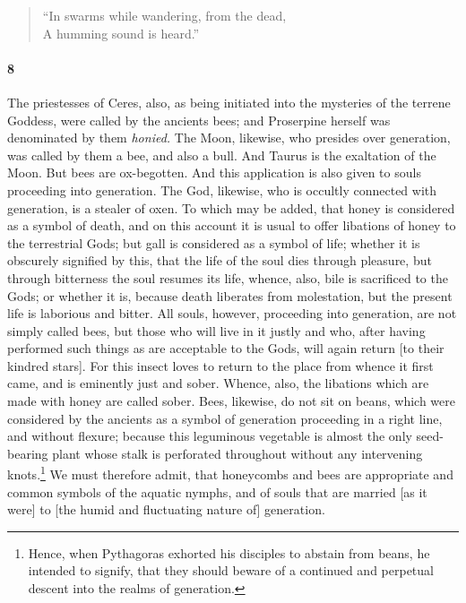 \documentclass[12pt]{article}
\begin{document}
\begin{verse}
``In swarms while wandering, from the dead,\\
A humming sound is heard.''
\end{verse}


\paragraph{8} The priestesses of Ceres, also, as being initiated into the
mysteries of the terrene Goddess, were called by the ancients bees; and
Proserpine herself was denominated by them \textit{honied.} The Moon, likewise,
who presides over generation, was called by them a bee, and also a bull. And
Taurus is the exaltation of the Moon. But bees are ox-begotten. And this
application is also given to souls proceeding into generation. The God,
likewise, who is occultly connected with generation, is a stealer of oxen. To
which may be added, that honey is considered as a symbol of death, and on this
account it is usual to offer libations of honey to the terrestrial Gods; but
gall is considered as a symbol of life; whether it is obscurely signified by
this, that the life of the soul dies through pleasure, but through bitterness
the soul resumes its life, whence, also, bile is sacrificed to the Gods; or
whether it is, because death liberates from molestation, but the present life
is laborious and bitter. All souls, however, proceeding into generation, are
not simply called bees, but those who will live in it justly and who, after
having performed such things as are acceptable to the Gods, will again return
[to their kindred stars]. For this insect loves to return to the place from
whence it first came, and is eminently just and sober. Whence, also, the
libations which are made with honey are called sober. Bees, likewise, do not
sit on beans, which were considered by the ancients as a symbol of generation
proceeding in a right line, and without flexure; because this leguminous
vegetable is almost the only seed-bearing plant whose stalk is perforated
throughout without any intervening knots.\footnote{Hence, when Pythagoras
exhorted his disciples to abstain from beans, he intended to signify, that they
should beware of a continued and perpetual descent into the realms of
generation.} We must therefore admit, that honeycombs and bees are appropriate
and common symbols of the aquatic nymphs, and of souls that are married [as it
were] to [the humid and fluctuating nature of] generation.
\end{document}
